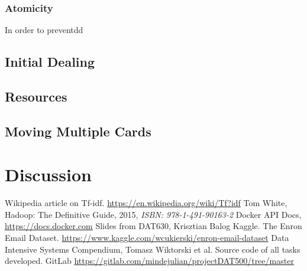 \documentclass[runningheads,a4paper]{llncs}
\begin{document}
\subsubsection{Atomicity}
In order to preventdd
\subsection{Initial Dealing}
\subsection{Resources}
\subsection{Moving Multiple Cards}

\section{Discussion}



\begin{thebibliography}{7}

 Wikipedia article on Tf-idf. \url{https://en.wikipedia.org/wiki/Tf?idf}
 Tom White, Hadoop: The Definitive Guide, 2015, \emph{ISBN: 978-1-491-90163-2}
 Docker API Docs, \url{https://docs.docker.com}
 Slides from DAT630, Krisztian Balog
 Kaggle. The Enron Email Dataset. \url{https://www.kaggle.com/wcukierski/enron-email-dataset}
 Data Intensive Systems Compendium, Tomasz Wiktorski et al.
 Source code of all tasks developed. GitLab \url{https://gitlab.com/mindejulian/projectDAT500/tree/master}

\end{thebibliography}
\end{document}
